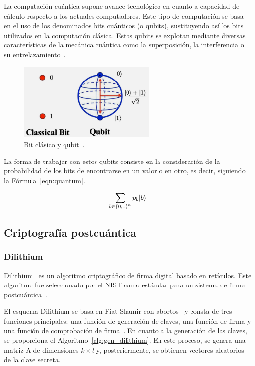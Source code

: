 La computación cuántica supone avance tecnológico en cuanto a capacidad de cálculo respecto a los actuales computadores.
Este tipo de computación se basa en el uso de los denominados bits cuánticos (o qubits), sustituyendo así los bits utilizados en la computación clásica.
Estos qubits se explotan mediante diversas características de la mecánica cuántica como la superposición, la interferencia o su entrelazamiento~\cite{Rietsche2022}.

\begin{figure}[h]
    \centering
    \includegraphics[width=0.6\textwidth]{figures/qubit.png}
    \caption{Bit clásico y qubit~\cite{Rietsche2022}.}
    \label{fig:qubit}
\end{figure}

La forma de trabajar con estos qubits consiste en la consideración de la probabilidad de los bits de encontrarse en un valor o en otro, es decir, siguiendo la Fórmula~\ref{eqn:quantum}.

\begin{equation}\label{eqn:quantum}
    \sum_{b\in {\{0, 1\}}^n} p_b \lvert b\rangle
\end{equation}



\subsection{Criptografía postcuántica}\label{subsec:postcuantica}

\subsubsection{Dilithium}\label{subsubsec:dilithium}

Dilithium~\cite{dilithium} es un algoritmo criptográfico de firma digital basado en retículos.
Este algoritmo fue seleccionado por el \ac{NIST} como estándar para un sistema de firma postcuántica~\cite{nist_sel}.

El esquema Dilithium se basa en Fiat-Shamir con abortos~\cite{10.1007/978-3-642-10366-7_35} y consta de tres funciones principales: una función de generación de claves, una función de firma y una función de comprobación de firma~\cite{dilithium_spec}.
En cuanto a la generación de las claves, se proporciona el Algoritmo~\ref{alg:gen_dilithium}.
En este proceso, se genera una matriz A de dimensiones $k \times l$ y, posteriormente, se obtienen vectores aleatorios de la clave secreta.

